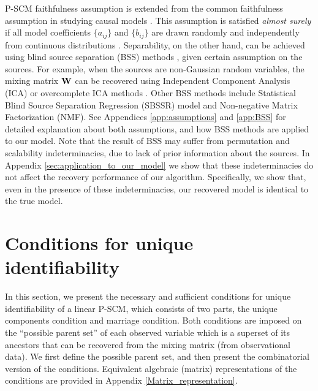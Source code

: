 \documentclass[12pt]{article}
\begin{document}
P-SCM faithfulness assumption is extended from the common faithfulness assumption in studying causal models \citep{spirtes2000causation,pearl2009causality}. This assumption is satisfied {\it{almost surely}} if all model coefficients $\{a_{ij}\}$ and $\{b_{ij}\}$ are drawn randomly and independently from continuous distributions \citep{meek2013strong}. %
Separability, on the other hand, can be achieved using blind source separation (BSS) methods \citep{comon2010handbook}, given certain assumption on the sources. For example, when the sources are non-Gaussian random variables, the mixing matrix $\bf{W}$ can be recovered using Independent Component Analysis (ICA) or overcomplete ICA methods \citep{comon1994independent, hyvarinen2002independent, lewicki2000learning}. Other BSS methods include Statistical Blind Source Separation Regression (SBSSR) model and Non-negative Matrix Factorization (NMF).
See Appendices \ref{app:assumptions} and \ref{app:BSS} for detailed explanation about both assumptions, and how BSS methods are applied to our model.
Note that the result of BSS may suffer from permutation and scalability indeterminacies, due to lack of prior information about the sources. In Appendix \ref{sec:application_to_our_model} we show that these indeterminacies do not affect the recovery performance of our algorithm. Specifically, we show that, even in the presence of these indeterminacies, our recovered model is identical to the true model. 

\section{Conditions for unique identifiability} \vspace{-2mm} \label{sec:definition_conditions}
In this section, we present the necessary and sufficient conditions for unique identifiability of a linear P-SCM, which consists of two parts, the unique components condition and marriage condition. Both conditions are imposed on the ``possible parent set'' of each observed variable which is a superset of its ancestors that can be recovered from the mixing matrix (from observational data).
We first define the possible parent set, and then present the combinatorial version of the conditions. Equivalent algebraic (matrix) representations of the conditions are provided in Appendix \ref{Matrix_representation}.
\end{document}

